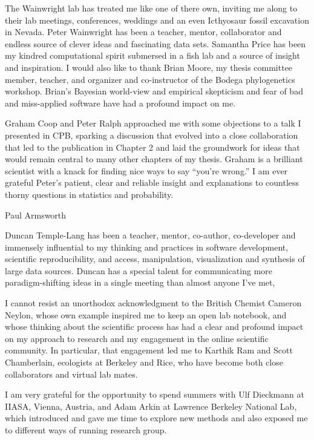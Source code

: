 The Wainwright lab has treated me like one of there own, inviting me along to their lab meetings, conferences, weddings and an even Icthyosaur fossil excavation in Nevada. Peter Wainwright has been a teacher, mentor, collaborator and endless source of clever ideas and fascinating data sets.  Samantha Price has been my kindred computational spirit submersed in a fish lab and a source of insight and inspiration. I would also like to thank Brian Moore, my thesis committee member, teacher, and organizer and co-instructor of the Bodega phylogenetics workshop. Brian's Bayesian world-view and empirical skepticism and fear of bad and miss-applied software have had a profound impact on me.  

Graham Coop and Peter Ralph approached me with some objections to a talk I presented in CPB, sparking a discussion that evolved into a close collaboration that led to the publication in Chapter 2 and laid the groundwork for ideas that would remain central to many other chapters of my thesis.  Graham is a brilliant scientist with a knack for finding nice ways to say ``you're wrong.''   I am ever grateful Peter's patient, clear and reliable insight and explanations to countless thorny questions in statistics and probability.  

Paul Armsworth 

Duncan Temple-Lang has been a teacher, mentor, co-author, co-developer and immensely influential to my thinking and practices in software development, scientific reproducibility, and access, manipulation, visualization and synthesis of large data sources. Duncan has a special talent for communicating more paradigm-shifting ideas in a single meeting than almost anyone I've met,  


I cannot resist an unorthodox acknowledgment to the British Chemist Cameron Neylon, whose own example inspired me to keep an open lab notebook, and whose thinking about the scientific process has had a clear and profound impact on my approach to research and my engagement in the online scientific community. In particular, that engagement led me to Karthik Ram and Scott Chamberlain, ecologists at Berkeley and Rice, who have become both close collaborators and virtual lab mates. 

I am very grateful for the opportunity to spend summers with Ulf Dieckmann at IIASA, Vienna, Austria, and Adam Arkin at Lawrence Berkeley National Lab, which introduced and gave me time to explore new methods and also exposed me to different ways of running research group.  

